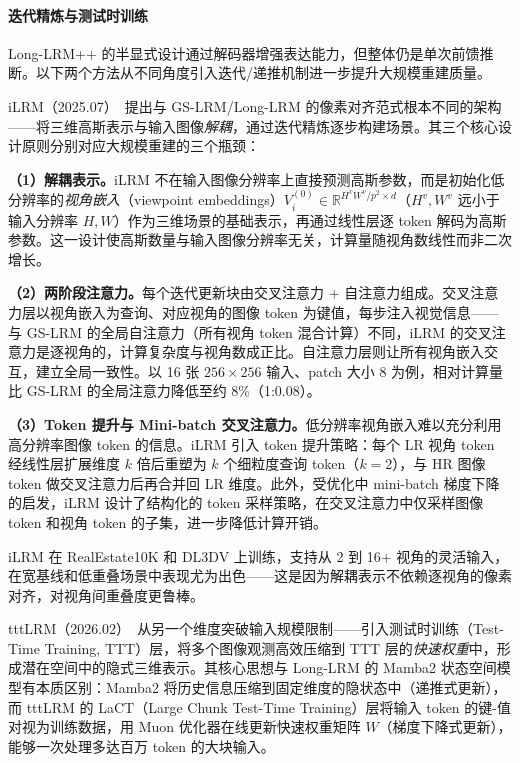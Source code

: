 \paragraph{迭代精炼与测试时训练}

Long-LRM++ 的半显式设计通过解码器增强表达能力，但整体仍是单次前馈推断。以下两个方法从不同角度引入迭代/递推机制进一步提升大规模重建质量。

iLRM（2025.07）~\cite{2507_23277}提出与 GS-LRM/Long-LRM 的像素对齐范式根本不同的架构——将三维高斯表示与输入图像\emph{解耦}，通过迭代精炼逐步构建场景。其三个核心设计原则分别对应大规模重建的三个瓶颈：

\textbf{（1）解耦表示。}iLRM 不在输入图像分辨率上直接预测高斯参数，而是初始化低分辨率的\emph{视角嵌入}（viewpoint embeddings）$V_i^{(0)} \in \mathbb{R}^{H^v W^v / p^2 \times d}$（$H^v, W^v$ 远小于输入分辨率 $H, W$）作为三维场景的基础表示，再通过线性层逐 token 解码为高斯参数。这一设计使高斯数量与输入图像分辨率无关，计算量随视角数线性而非二次增长。

\textbf{（2）两阶段注意力。}每个迭代更新块由交叉注意力 + 自注意力组成。交叉注意力层以视角嵌入为查询、对应视角的图像 token 为键值，每步注入视觉信息——与 GS-LRM 的全局自注意力（所有视角 token 混合计算）不同，iLRM 的交叉注意力是逐视角的，计算复杂度与视角数成正比。自注意力层则让所有视角嵌入交互，建立全局一致性。以 16 张 $256 \times 256$ 输入、patch 大小 8 为例，相对计算量比 GS-LRM 的全局注意力降低至约 8\%（1:0.08）。

\textbf{（3）Token 提升与 Mini-batch 交叉注意力。}低分辨率视角嵌入难以充分利用高分辨率图像 token 的信息。iLRM 引入 token 提升策略：每个 LR 视角 token 经线性层扩展维度 $k$ 倍后重塑为 $k$ 个细粒度查询 token（$k{=}2$），与 HR 图像 token 做交叉注意力后再合并回 LR 维度。此外，受优化中 mini-batch 梯度下降的启发，iLRM 设计了结构化的 token 采样策略，在交叉注意力中仅采样图像 token 和视角 token 的子集，进一步降低计算开销。

iLRM 在 RealEstate10K 和 DL3DV 上训练，支持从 2 到 16+ 视角的灵活输入，在宽基线和低重叠场景中表现尤为出色——这是因为解耦表示不依赖逐视角的像素对齐，对视角间重叠度更鲁棒。

tttLRM（2026.02）~\cite{2602_20160}从另一个维度突破输入规模限制——引入测试时训练（Test-Time Training, TTT）层，将多个图像观测高效压缩到 TTT 层的\emph{快速权重}中，形成潜在空间中的隐式三维表示。其核心思想与 Long-LRM 的 Mamba2 状态空间模型有本质区别：Mamba2 将历史信息压缩到固定维度的隐状态中（递推式更新），而 tttLRM 的 LaCT（Large Chunk Test-Time Training）层将输入 token 的键-值对视为训练数据，用 Muon 优化器在线更新快速权重矩阵 $W$（梯度下降式更新），能够一次处理多达百万 token 的大块输入。


